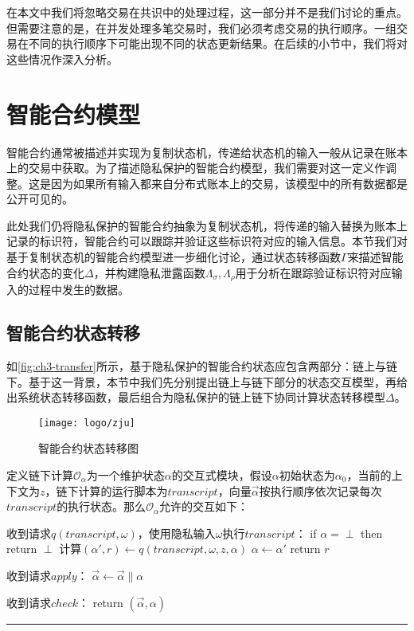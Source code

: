 在本文中我们将忽略交易在共识中的处理过程，这一部分并不是我们讨论的重点。但需要注意的是，在并发处理多笔交易时，我们必须考虑交易的执行顺序。一组交易在不同的执行顺序下可能出现不同的状态更新结果。在后续的小节中，我们将对这些情况作深入分析。
\section{智能合约模型}
智能合约通常被描述并实现为复制状态机，传递给状态机的输入一般从记录在账本上的交易中获取。为了描述隐私保护的智能合约模型，我们需要对这一定义作调整。这是因为如果所有输入都来自分布式账本上的交易，该模型中的所有数据都是公开可见的。

此处我们仍将隐私保护的智能合约抽象为复制状态机，将传递的输入替换为账本上记录的标识符，智能合约可以跟踪并验证这些标识符对应的输入信息。本节我们对基于复制状态机的智能合约模型进一步细化讨论，通过状态转移函数$\Gamma$来描述智能合约状态的变化$\Delta$，并构建隐私泄露函数$\Lambda_\sigma, \Lambda_\rho$用于分析在跟踪验证标识符对应输入的过程中发生的数据。
\subsection{智能合约状态转移}
如\autoref{fig:ch3-transfer}所示，基于隐私保护的智能合约状态应包含两部分：链上与链下。基于这一背景，本节中我们先分别提出链上与链下部分的状态交互模型，再给出系统状态转移函数，最后组合为隐私保护的链上链下协同计算状态转移模型$\Delta$。

\begin{figure}[htbp]
    \centering
    \texttt{[image: logo/zju]}
    \caption{\label{fig:ch3-transfer}智能合约状态转移图}
\end{figure}

定义链下计算$\mathcal{O}_{\alpha}$为一个维护状态$\alpha$的交互式模块，假设$\alpha$初始状态为$\alpha_0$，当前的上下文为$z$，链下计算的运行脚本为$transcript$，向量$\vec{\alpha}$按执行顺序依次记录每次$transcript$的执行状态。那么$\mathcal{O}_{\alpha}$允许的交互如下：

\noindent\hrulefill
\begin{description}
\item 收到请求$q(transcript, \omega)$，使用隐私输入$\omega$执行$transcript$：\newline
if $\alpha = \perp$ then return $\perp$\newline
计算$(\alpha', r) \leftarrow q(transcript, \omega, z, \alpha)$\newline
$\alpha \leftarrow \alpha'$\newline
return $r$
\item 收到请求$apply$：\newline
$\vec{\alpha} \leftarrow \vec{\alpha} \parallel \alpha$
\item 收到请求$check$：\newline
return $(\vec{\alpha}, \alpha)$
\end{description}
\noindent\hrule
~\\

